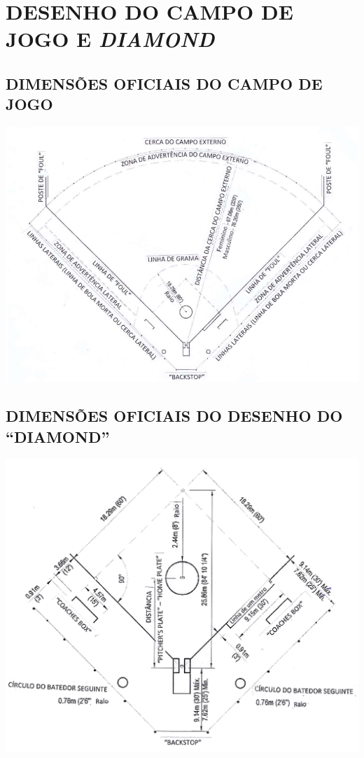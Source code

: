 \chapter{DESENHO DO CAMPO DE JOGO E \textit{DIAMOND}}
\minitoc%

\section{DIMENSÕES OFICIAIS DO CAMPO DE JOGO}

{\begin{center}
		\includegraphics[width=.80\textwidth]{fig/campo01}
\end{center}}
\clearpage
\section{DIMENSÕES OFICIAIS DO DESENHO DO “DIAMOND” }

{\begin{center}
		\includegraphics[width=.85\textwidth]{fig/campo02}\end{center}}

